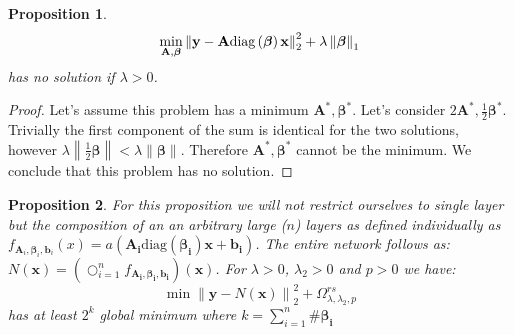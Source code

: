 \documentclass{article}
\newcommand{\norm}[1]{\left\lVert#1\right\rVert}
\newcommand{\diag}[1]{\text{diag}\left(#1\right)}
\newtheorem{proposition}{Proposition}[section]
\begin{document}
\begin{proposition}
\label{unconstrained_shrinknet_no_min}
\begin{equation*}
     \min_{\bf{A}, \bm{\beta}} \norm{\bf{y} - \bf{A}\diag{\bm{\beta}}\bf{x}}_2^2 + \lambda \norm{\bm{\beta}}_1
\end{equation*}
has no solution if $\lambda > 0$.
\end{proposition}
\begin{proof}
  Let's assume this problem has a minimum $\bm{A}^*, \bm{\beta}^*$. Let's consider $2\bm{A}^*, \frac{1}{2}\bm{\beta}^*$. Trivially the first component of the sum is identical for the two solutions, however $\lambda\norm{\frac{1}{2}\bm{\beta}} < \lambda\norm{\bm{\beta}}$. Therefore $\bm{A}^*, \bm{\beta}^*$ cannot be the minimum. We conclude that this problem has no solution.
\end{proof}
\begin{proposition}
  \label{shrinknet_regularized_minimum}
For this proposition we will not restrict ourselves to single layer but the composition of an an arbitrary large ($n$) layers as defined individually as $f_{\bm{A}_i, \bm{\beta}_i, \bm{b}_i}(x) = a(\bm{A_i}\diag{\bm{\beta_i}}\bm{x} + \bm{b_i})$. The entire network follows as: $N(\bm{x}) = \left(\bigcirc_{i=1}^n f_{\bm{A_i}, \bm{\beta_i}, \bm{b_i}}\right)(\bm{x})$. For $\lambda > 0$, $\lambda_2 > 0$ and $p > 0$ we have:
  \begin{equation*}
    \min \norm{\bm{y} - N(\bm{x})}_2^2 + \Omega_{\lambda, \lambda_2, p}^{rs}
  \end{equation*}
  has at least $2^k$ global minimum where $k = \sum_{i=1}^n \#\bm{\beta_i}$
\end{proposition}
\end{document}
